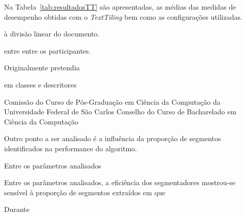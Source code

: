 Na Tabela~\ref{tab:resultadosTT} são apresentadas, as médias das medidas de desempenho obtidas com o \textit{TextTiling} bem como as configurações utilizadas.


















































à divisão linear do documento.  

entre entre os participantes. 







Originalmente pretendia 



em classes e descritores 



Comissão do Curso de Pós-Graduação em Ciência da Computação da Universidade Federal de São Carlos 
Conselho do Curso de Bacharelado em Ciência da Computação










Outro ponto a ser analisado é a influência da proporção de segmentos identificados na performance do algoritmo. 

Entre os parâmetros analisados

Entre os parâmetros analisados, a eficiência dos segmentadores mostrou-se sensível à proporção de segmentos extraídos em que 

Durante








